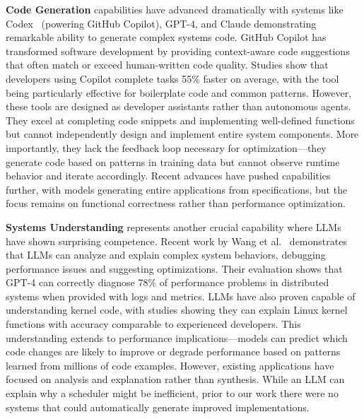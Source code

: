 \textbf{Code Generation} capabilities have advanced dramatically with systems like Codex~\cite{chen2021codex} (powering GitHub Copilot), GPT-4, and Claude demonstrating remarkable ability to generate complex systems code. GitHub Copilot has transformed software development by providing context-aware code suggestions that often match or exceed human-written code quality. Studies show that developers using Copilot complete tasks 55\% faster on average, with the tool being particularly effective for boilerplate code and common patterns. However, these tools are designed as developer assistants rather than autonomous agents. They excel at completing code snippets and implementing well-defined functions but cannot independently design and implement entire system components. More importantly, they lack the feedback loop necessary for optimization—they generate code based on patterns in training data but cannot observe runtime behavior and iterate accordingly. Recent advances have pushed capabilities further, with models generating entire applications from specifications, but the focus remains on functional correctness rather than performance optimization.

\textbf{Systems Understanding} represents another crucial capability where LLMs have shown surprising competence. Recent work by Wang et al.~\cite{wang2024llmsys} demonstrates that LLMs can analyze and explain complex system behaviors, debugging performance issues and suggesting optimizations. Their evaluation shows that GPT-4 can correctly diagnose 78\% of performance problems in distributed systems when provided with logs and metrics. LLMs have also proven capable of understanding kernel code, with studies showing they can explain Linux kernel functions with accuracy comparable to experienced developers. This understanding extends to performance implications—models can predict which code changes are likely to improve or degrade performance based on patterns learned from millions of code examples. However, existing applications have focused on analysis and explanation rather than synthesis. While an LLM can explain why a scheduler might be inefficient, prior to our work there were no systems that could automatically generate improved implementations.

